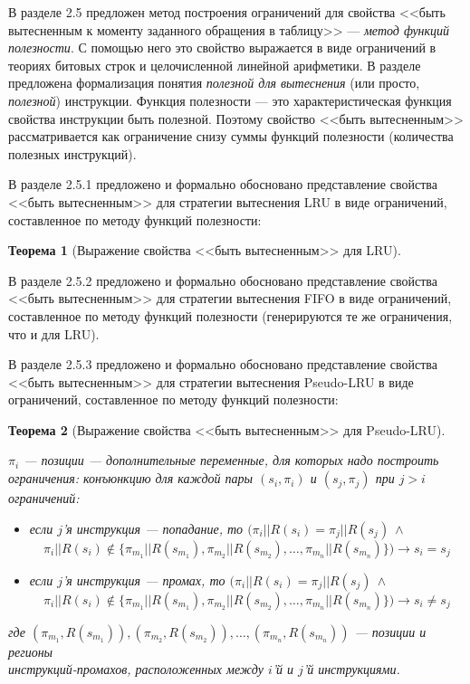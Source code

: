 \documentclass[14pt,autoref,href
,facsimile
]{disser}
\newtheorem{theorem}{Теорема}
\newcommand{\LRU}{LRU\xspace}
\newcommand{\PseudoLRU}{Pseudo-LRU\xspace}
\begin{document}
В разделе 2.5 предложен метод построения ограничений для свойства <<быть вытесненным к моменту заданного обращения в таблицу>> --- \emph{метод функций полезности}. С помощью него это свойство выражается в виде ограничений в теориях битовых строк и целочисленной линейной арифметики. В разделе предложена формализация понятия \emph{полезной для вытеснения} (или просто, \emph{полезной}) инструкции. Функция полезности --- это характеристическая функция свойства инструкции быть полезной. Поэтому свойство <<быть вытесненным>> рассматривается как ограничение снизу суммы функций полезности (количества полезных инструкций).

В разделе 2.5.1 предложено и формально обосновано представление свойства <<быть вытесненным>> для стратегии вытеснения LRU в виде ограничений, составленное по методу функций полезности:
\begin{theorem}[Выражение свойства <<быть вытесненным>> для \LRU]\label{correct_mirror_LRU} \LRUusefuls
\end{theorem}

В разделе 2.5.2 предложено и формально обосновано представление свойства <<быть вытесненным>> для стратегии вытеснения FIFO  в виде ограничений, составленное по методу функций полезности (генерируются те же ограничения, что и для LRU).

В разделе 2.5.3 предложено и формально обосновано представление свойства <<быть вытесненным>> для стратегии вытеснения Pseudo-LRU в виде ограничений, составленное по методу функций полезности:
\begin{theorem}[Выражение свойства <<быть вытесненным>> для \PseudoLRU]\label{correct_mirror_PLRU} \PLRUusefuls

$\pi_i$ --- позиции --- дополнительные переменные, для которых надо построить ограничения:
конъюнкцию для каждой пары $(s_i,\pi_i)$ и $(s_j, \pi_j)$ при $j > i$ ограничений:
\begin{itemize}
    \item если $j$'я инструкция --- попадание, то $(\pi_i||R(s_i) =
\pi_j||R(s_j)~\wedge$ $$\pi_i||R(s_i) \notin \{\pi_{m_1}||R(s_{m_1}),
\pi_{m_2}||R(s_{m_2}), \dots, \pi_{m_n}||R(s_{m_n})\}) \rightarrow s_i = s_j$$
    \item если $j$'я инструкция --- промах, то $(\pi_i||R(s_i) =
\pi_j||R(s_j)~\wedge$ $$\pi_i||R(s_i) \notin \{\pi_{m_1}||R(s_{m_1}),
\pi_{m_2}||R(s_{m_2}), \dots, \pi_{m_n}||R(s_{m_n})\}) \rightarrow s_i \neq
s_j$$
\end{itemize}
где $(\pi_{m_1},R(s_{m_1})), (\pi_{m_2},R(s_{m_2})), \dots,
(\pi_{m_n},R(s_{m_n}))$ --- позиции и регионы\\инструкций-промахов,
расположенных между $i$'й и $j$'й инструкциями.
\end{theorem}
\end{document}
